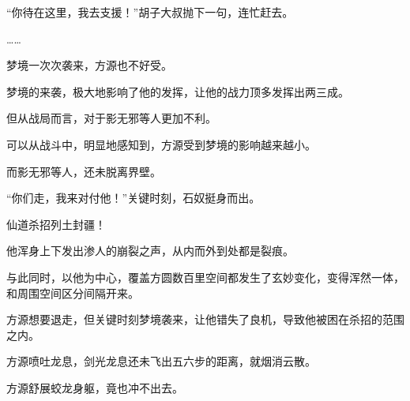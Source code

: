 \begin{this_body}
“你待在这里，我去支援！”胡子大叔抛下一句，连忙赶去。

……

梦境一次次袭来，方源也不好受。

梦境的来袭，极大地影响了他的发挥，让他的战力顶多发挥出两三成。

但从战局而言，对于影无邪等人更加不利。

可以从战斗中，明显地感知到，方源受到梦境的影响越来越小。

而影无邪等人，还未脱离界壁。

“你们走，我来对付他！”关键时刻，石奴挺身而出。

仙道杀招列土封疆！

他浑身上下发出渗人的崩裂之声，从内而外到处都是裂痕。

与此同时，以他为中心，覆盖方圆数百里空间都发生了玄妙变化，变得浑然一体，和周围空间区分间隔开来。

方源想要退走，但关键时刻梦境袭来，让他错失了良机，导致他被困在杀招的范围之内。

方源喷吐龙息，剑光龙息还未飞出五六步的距离，就烟消云散。

方源舒展蛟龙身躯，竟也冲不出去。

\end{this_body}

